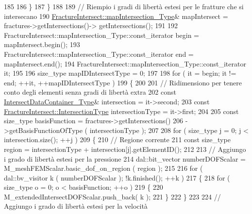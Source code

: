 \begin{DoxyCode}
185 
186                 \}
187         \}
188 
189         \textcolor{comment}{// Riempio i gradi di libertà estesi per le fratture che si intersecano}
190         \hyperlink{classFractureIntersect_a4eea7d0aca48cdd36ea1756e75280332}{FractureIntersect::mapIntersection\_Type}& mapIntersect = 
      fractures->getIntersections()-> getIntersections();
191 
192         FractureIntersect::mapIntersection\_Type::const\_iterator begin = mapIntersect.begin();
193         FractureIntersect::mapIntersection\_Type::const\_iterator end = mapIntersect.end();
194         FractureIntersect::mapIntersection\_Type::const\_iterator it;
195 
196         size\_type mapIDIntersectType = 0;
197         
198         \textcolor{keywordflow}{for} ( it = begin; it != end; ++it, ++mapIDIntersectType )
199         \{
200 
201                 \textcolor{comment}{// Ridimensiono per tenere conto degli elementi senza gradi di libertà extra}
202                 \textcolor{keyword}{const} \hyperlink{IntersectData_8h_a822ec3b760dfb603e1cf0bfe3ad5636a}{IntersectDataContainer\_Type}& intersection = it->second;
203                 \textcolor{keyword}{const} \hyperlink{classFractureIntersect_a9a4e4a784fa4c8e359767ed543f89dc5}{FractureIntersect::IntersectionType} 
      intersectionType = it->first;
204 
205                 \textcolor{keyword}{const} size\_type basisFunction = fractures->getIntersections()
206                                                 ->getBasisFunctionOfType ( intersectionType );
207 
208                 \textcolor{keywordflow}{for} ( size\_type j = 0; j < intersection.size(); ++j )
209                 \{
210                         \textcolor{comment}{// Regione corrente}
211                         \textcolor{keyword}{const} size\_type region = intersectionType + intersection[j].getElementID();
212 
213                         \textcolor{comment}{// Aggiungo i grado di libertà estesi per la pressione}
214                         dal::bit\_vector numberDOFScalar = M\_meshFEMScalar.basic\_dof\_on\_region ( region );
215 
216                         \textcolor{keywordflow}{for} ( dal::bv\_visitor k ( numberDOFScalar ); !k.finished(); ++k )
217                         \{
218                                 \textcolor{keywordflow}{for} ( size\_type o = 0; o < basisFunction; ++o )
219                                 \{
220                                         M\_extendedIntersectDOFScalar.push\_back( k );
221                                 \}
222                         \}
223 
224                         \textcolor{comment}{// Aggiungo i grado di libertà estesi per la velocità}

\end{DoxyCode}
